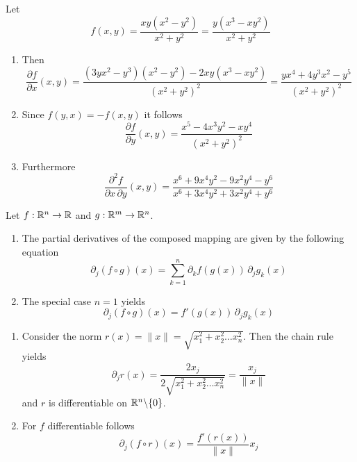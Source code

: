 \begin{examples}
    Let
    \[
        f(x,y) = \frac{xy(x^2 - y^2)}{x^2 + y^2} = \frac{y(x^3 - xy^2)}{x^2 + y^2}
    \]
    \begin{enumerate}
        \item Then
              \[
                  \frac{\partial f}{\partial x}(x,y)
                  = \frac{(3yx^2 - y^3)(x^2 - y^2) - 2xy(x^3 - xy^2)}{{(x^2 + y^2)}^2}
                  = \frac{yx^4 + 4y^3x^2 - y^5}{{(x^2 + y^2)}^2}
              \]
        \item
              Since \( f(y,x) = - f(x,y)\) it follows
              \[
                  \frac{\partial f}{\partial y}(x,y) = \frac{x^5 - 4x^3y^2 - xy^4}{{(x^2 + y^2)}^2}
              \]
        \item Furthermore
              \[
                  \frac{\partial^2 f}{\partial x\,\partial y}(x,y) =
                  \frac{x^{6} + 9 x^{4} y^{2} - 9 x^{2} y^{4} - y^{6}}{x^{6} + 3 x^{4} y^{2} + 3 x^{2} y^{4} + y^{6}}
              \]
    \end{enumerate}
\end{examples}
\bigskip


\begin{lemma}
    Let \( f: \mathbb{R}^n \to \mathbb{R} \) and \( g: \mathbb{R}^m \to \mathbb{R}^n \).
    \begin{enumerate}
        \item The partial derivatives of the composed mapping are given by the following equation
              \[
                  \partial_j (f \circ g) (x) = \sum_{k=1}^n \partial_k f(g(x))\,\partial_j g_k(x)
              \]
        \item The special case \( n = 1 \) yields
              \[
                  \partial_j (f \circ g) (x) = f'(g(x))\,\partial_j g_k(x)
              \]
    \end{enumerate}
\end{lemma}
\bigskip


\begin{examples}\hfill
    \begin{enumerate}
        \item Consider the norm \( r(x) = \|x\| = \sqrt{x_1^2 + x_2^2 \dots x_n^2} \). Then the chain rule yields
              \[
                  \partial_j r(x) = \frac{2 x_j}{2 \sqrt{x_1^2 + x_2^2 \dots x_n^2}} = \frac{x_j}{\|x\|}
              \]
              and \( r \) is differentiable on \( \mathbb{R}^n {\setminus} \{ 0 \} \).
        \item For \( f \) differentiable follows
              \[
                  \partial_j (f \circ r)(x) = \frac{f'(r(x))}{\|x\|} x_j
              \]
    \end{enumerate}
\end{examples}
\bigskip


